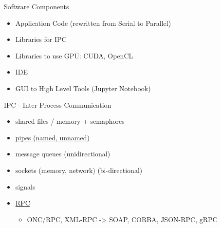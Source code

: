 \documentclass[ignorenonframetext,]{beamer}
\providecommand{\tightlist}{%
  \setlength{\itemsep}{0pt}\setlength{\parskip}{0pt}}
\begin{document}
\begin{frame}{Software Components}

\begin{itemize}
\tightlist
\item
  Application Code (rewritten from Serial to Parallel)
\item
  Libraries for IPC
\item
  Libraries to use GPU: CUDA, OpenCL
\item
  IDE
\item
  GUI to High Level Tools (Jupyter Notebook)
\end{itemize}


\end{frame}

\begin{frame}{IPC - Inter Process Communication}

\begin{itemize}
\tightlist
\item
  shared files / memory + semaphores
\item
  \href{https://opensource.com/article/19/4/interprocess-communication-linux-channels}{pipes
  (named, unnamed)}
\item
  message queues (unidirectional)
\item
  sockets (memory, network) (bi-directional)
\item
  signals
\item
  \href{https://en.wikipedia.org/wiki/Remote_procedure_call}{RPC}

  \begin{itemize}
  \tightlist
  \item
    ONC/RPC, XML-RPC -\textgreater{} SOAP, CORBA, JSON-RPC, gRPC
  \end{itemize}

\end{itemize}


\end{frame}
\end{document}
